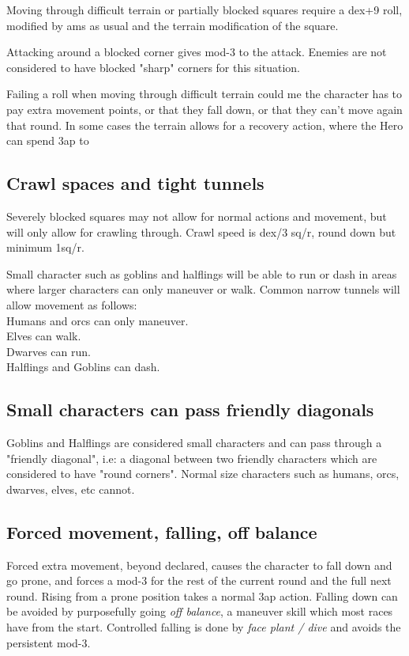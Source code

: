Moving through difficult terrain or partially blocked squares require a dex+9 roll, modified by ams as usual and the terrain modification of the square.

Attacking around a blocked corner gives mod-3 to the attack. Enemies are not considered to have blocked "sharp" corners for this situation.

Failing a roll when moving through difficult terrain could me the character has to pay extra movement points, or that they fall down, or that they can't move again that round. In some cases the terrain allows for a recovery action, where the Hero can spend 3ap to


\subsection*{Crawl spaces and tight tunnels}
Severely blocked squares may not allow for normal actions and movement, but will only allow for crawling through. Crawl speed is dex/3 sq/r, round down but minimum 1sq/r.

Small character such as goblins and halflings will be able to run or dash in areas where larger characters can only maneuver or walk.
Common narrow tunnels will allow movement as follows: \\
Humans and orcs can only maneuver. \\
Elves can walk. \\
Dwarves can run. \\
Halflings and Goblins can dash.


\subsection*{Small characters can pass friendly diagonals}
Goblins and Halflings are considered small characters and can pass through a "friendly diagonal", i.e: a diagonal between two friendly characters which are considered to have "round corners".
Normal size characters such as humans, orcs, dwarves, elves, etc cannot.


\subsection*{Forced movement, falling, off balance}
Forced extra movement, beyond declared, causes the character to fall down and go prone, and forces a mod-3 for the rest of the current round and the full next round. Rising from a prone position takes a normal 3ap action. Falling down can be avoided by purposefully going \emph{off balance}, a maneuver skill which most races have from the start. Controlled falling is done by \emph{face plant / dive} and avoids the persistent mod-3.

